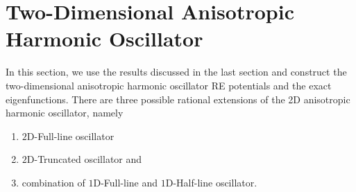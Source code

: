 \documentclass[12pt]{article}
\numberwithin{equation}{section} %
\begin{document}











\section{Two-Dimensional Anisotropic Harmonic Oscillator}

In this section, we use the results discussed in the last section and construct the two-dimensional anisotropic harmonic oscillator RE potentials and the exact eigenfunctions. There are three possible rational extensions of the 2D anisotropic harmonic oscillator, namely
\begin{enumerate}
    \item $2$D-Full-line oscillator
    \item $2$D-Truncated oscillator and
    \item combination of $1$D-Full-line and $1$D-Half-line oscillator.
\end{enumerate}
\end{document}
